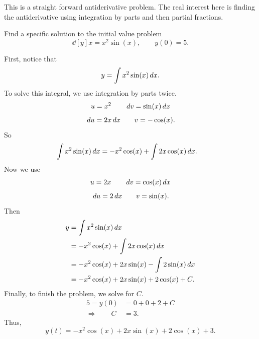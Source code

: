 \documentclass[noinstructornotes]{ximera}
\begin{document}
\begin{instructorNotes}
This is a straight forward antiderivative problem.  
The real interest here is finding the antiderivative using integration by parts and then partial fractions.  
\end{instructorNotes}








\begin{problem}
Find a specific solution to the initial value problem
	\[
	\dd[y]{x} = x^2 \sin(x), \qquad y(0) = 5.
	\]
	
	\begin{freeResponse}
	First, notice that
		\[
		y = \int x^2 \sin(x) \,d x.
		\]
	To solve this integral, we use integration by parts twice.  
		{\color{red}
		\[
		u = x^2 		\qquad	\,d v = \sin(x) \,d x
		\]
		\[
		\,d u = 2x \,d x	\qquad	v = -\cos(x).
		\]
		}
	So
		\begin{align*}
		\int x^2 \sin(x) \,d x
		&= -x^2 \cos(x) + \int 2x \cos (x) \,d x.
		\end{align*}
	Now we use
		{\color{red}
		\[
		u = 2x 		\qquad	\,d v = \cos(x) \,d x
		\]
		\[
		\,d u = 2 \,d x	\qquad	v = \sin(x).
		\]
		}
	Then
		\begin{align*}
		y &= \int x^2 \sin(x) \,d x  \\
		&= -x^2 \cos(x) + \int 2x \cos (x) \,d x  \\
		&= -x^2 \cos(x) + 2x\sin(x) - \int 2\sin(x) \,d x  \\
		&= -x^2\cos(x) + 2x\sin(x) + 2\cos(x) + C.
		\end{align*}
	Finally, to finish the problem, we solve for $C$.  
		\begin{align*}
		5 = y(0) &= 0 + 0 + 2 + C  \\
		\Longrightarrow \qquad C &= 3.
		\end{align*}
	Thus,
		\[
		y(t) = -x^2\cos(x) + 2x\sin(x) + 2\cos(x) + 3.
		\]
	\end{freeResponse}
	
\end{problem}
\end{document}
